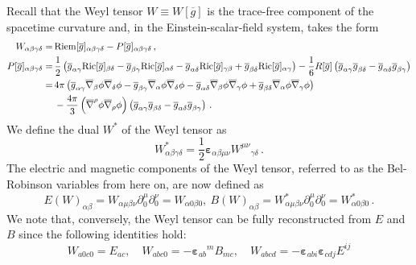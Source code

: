 \documentclass[11pt,leqno,textwidth=10cm]{amsart}
\numberwithin{equation}{section}
\theoremstyle{definition}
\theoremstyle{plain}
\newcommand{\1}{\mathbbm{1}}
\newcommand{\g}{\overline{g}}
\newcommand{\nabbar}{\overline{\nabla}}
\newcommand{\Ric}{\text{\normalfont{Ric}}}
\newcommand{\Riem}{\text{\normalfont{Riem}}}
\renewcommand{\epsilon}{\varepsilon}
\newcommand{\del}{\partial}
\newcommand{\epsilonLC}{\bm{\epsilon}}
\newcommand{\change}[1]{\color{black}#1\color{black}}
\begin{document}
\noindent\change{ Recall that the Weyl tensor $W\equiv W[\g]$ is the trace-free component of the spacetime curvature and, in the Einstein-scalar-field system, takes the form
\begin{align*}
W_{\alpha\beta\gamma\delta}=&\,\Riem[\g]_{\alpha\beta\gamma\delta}-P[\g]_{\alpha\beta\gamma\delta}\,,\\
P[\g]_{\alpha\beta\gamma\delta}=&\,\frac12\left(\g_{\alpha\gamma}\Ric[\g]_{\beta\delta}-\g_{\beta\gamma}\Ric[\g]_{\alpha\delta}-\g_{\alpha\delta}\Ric[\g]_{\gamma\beta}+\g_{\beta\delta}\Ric[\g]_{\alpha\gamma}\right)-\frac16 R[\g]\left(\g_{\alpha\gamma}\g_{\beta\delta}-\g_{\alpha\delta}\g_{\beta\gamma}\right)\\
=&\,4\pi\left(\g_{\alpha\gamma}\nabbar_{\beta}\phi\nabbar_\delta\phi-\g_{\beta\gamma}\nabbar_\alpha\phi\nabbar_\delta\phi-\g_{\alpha\delta}\nabbar_\beta\phi\nabbar_{\gamma}\phi+\g_{\beta\delta}\nabbar_{\alpha}\phi\nabbar_{\gamma}\phi\right)\\
&\,-\frac{4\pi}3 \left(\nabbar^\rho\phi\nabbar_\rho\phi\right)\left(\g_{\alpha\gamma}\g_{\beta\delta}-\g_{\alpha\delta}\g_{\beta\gamma}\right)\,.
\end{align*}}
We define the dual $W^\ast$ of the Weyl tensor as
\[W^\ast_{\alpha\beta\gamma\delta}=\frac12\epsilonLC_{\alpha\beta\mu\nu}{W^{\mu\nu}}_{\gamma\delta}\,.\]
The electric and magnetic components of the Weyl tensor\change{, referred to as the Bel-Robinson variables from here on, }are now defined as
\[E(W)_{\alpha\beta}=W_{\alpha\mu\beta\nu}\del_0^{\mu}\del_0^{\nu}=W_{\alpha 0\beta 0},\ B(W)_{\alpha\beta}=W^\ast_{\alpha\mu\beta\nu}\del_0^\mu \del_0^\nu=W^{\ast}_{\alpha 0\beta 0}\,.\]
We note that, conversely, the Weyl tensor can be fully reconstructed from $E$ and $B$ since the following identities hold:
\begin{equation}\label{eq:Weyl-reconstruct}
W_{a0c0}=E_{ac},\quad W_{abc0}=-{\epsilonLC_{ab}}^mB_{mc},\quad W_{abcd}=-\epsilonLC_{abi}\epsilonLC_{cdj}E^{ij}
\end{equation}
\end{document}
